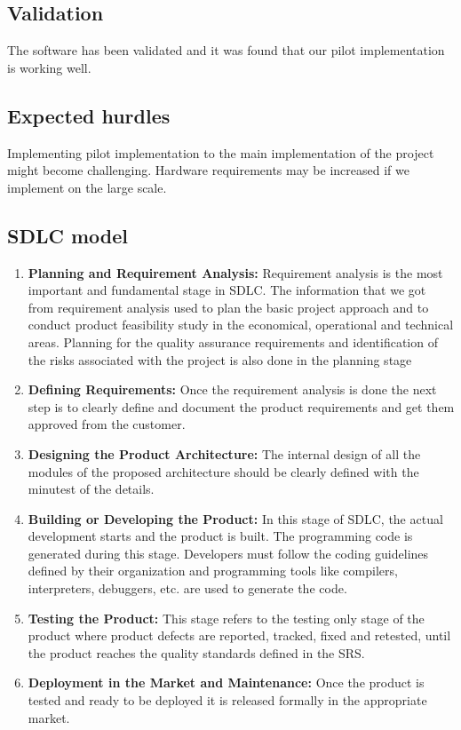 \subsection{Validation}
The software has been validated and it was found that our pilot implementation is working well.


\subsection{Expected hurdles}
Implementing pilot implementation to the main implementation of the project might become challenging. Hardware requirements may be increased if we implement on the large scale.
\subsection{SDLC model}
\begin{enumerate}
    \item \textbf{Planning and Requirement Analysis: } Requirement analysis is the most important and fundamental stage in SDLC. The information that we got from requirement analysis used to plan the basic project approach and to conduct product feasibility study in the economical, operational and technical areas. Planning for the quality assurance requirements and identification of the risks associated with the project is also done in the planning stage
    \item \textbf{Defining Requirements: } Once the requirement analysis is done the next step is to clearly define and document the product requirements and get them approved from the customer. 
    \item \textbf{Designing the Product Architecture: } The internal design of all the modules of the proposed architecture should be clearly defined with the minutest of the details.
    \item \textbf{Building or Developing the Product: } In this stage of SDLC, the actual development starts and the product is built. The programming code is generated during this stage. Developers must follow the coding guidelines defined by their organization and programming tools like compilers, interpreters, debuggers, etc. are used to generate the code. 
    \item \textbf{Testing the Product: } This stage refers to the testing only stage of the product where product defects are reported, tracked, fixed and retested, until the product reaches the quality standards defined in the SRS.
    \item \textbf{Deployment in the Market and Maintenance: } Once the product is tested and ready to be deployed it is released formally in the appropriate market.
\end{enumerate}

